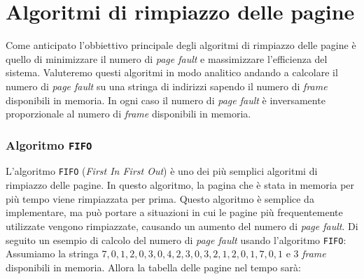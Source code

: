 \section{Algoritmi di rimpiazzo delle pagine}
    Come anticipato l'obbiettivo principale degli algoritmi di rimpiazzo delle pagine è quello di minimizzare il numero di \textit{page fault} e massimizzare l'efficienza del sistema. Valuteremo questi algoritmi in modo analitico andando a calcolare il numero di \textit{page fault} su una stringa di indirizzi sapendo il numero di \textit{frame} disponibili in memoria. In ogni caso il numero di \textit{page fault} è inversamente proporzionale al numero di \textit{frame} disponibili in memoria.
    \subsubsection{Algoritmo \texttt{FIFO}}
        L'algoritmo \texttt{FIFO} (\textit{First In First Out}) è uno dei più semplici algoritmi di rimpiazzo delle pagine. In questo algoritmo, la pagina che è stata in memoria per più tempo viene rimpiazzata per prima. Questo algoritmo è semplice da implementare, ma può portare a situazioni in cui le pagine più frequentemente utilizzate vengono rimpiazzate, causando un aumento del numero di \textit{page fault}. Di seguito un esempio di calcolo del numero di \textit{page fault} usando l'algoritmo \texttt{FIFO}:\newline
        Assumiamo la stringa $7,0,1,2,0,3,0,4,2,3,0,3,2,1,2,0,1,7,0,1$ e 3 \textit{frame} disponibili in memoria. Allora la tabella delle pagine nel tempo sarà:
